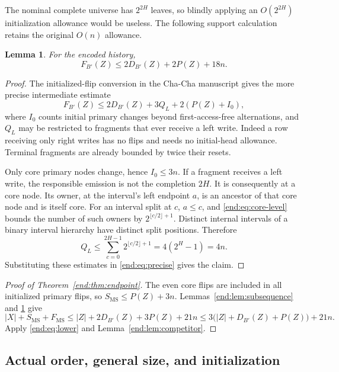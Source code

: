 \documentclass[11pt]{article}
\numberwithin{equation}{section}
\newtheorem{lemma}[theorem]{Lemma}
\newcommand{\MS}{\mathrm{MS}}
\begin{document}
The nominal complete universe has $2^{2H}$ leaves, so blindly applying
an $O(2^{2H})$ initialization allowance would be useless. The following
support calculation retains the original $O(n)$ allowance.

\begin{lemma}\label{end:lem:initial}
For the encoded history,
\[
 F_{B'}(Z)\le 2D_{B'}(Z)+2P(Z)+18n.
\]
\end{lemma}
\begin{proof}
The initialized-flip conversion in the Cha-Cha manuscript gives
the more precise intermediate estimate
\begin{equation}\label{end:eq:precise}
 F_{B'}(Z)\le 2D_{B'}(Z)+3Q_L+2(P(Z)+I_0),
\end{equation}
where $I_0$ counts initial primary changes beyond first-access-free
alternations, and $Q_L$ may be restricted to fragments that ever
receive a left write. Indeed a row receiving only right writes has no
flips and needs no initial-head allowance. Terminal fragments are
already bounded by twice their resets.

Only core primary nodes change, hence $I_0\le3n$. If a fragment
receives a left write, the responsible emission is not the completion
$2H$. It is consequently at a core node. Its owner, at the interval's
left endpoint $a$, is an ancestor of that core node and is itself core.
For an interval split at $c$, $a\le c$, and
\eqref{end:eq:core-level} bounds the number of such owners by
$2^{\lfloor c/2\rfloor+1}$. Distinct internal intervals of a binary
interval hierarchy have distinct split positions. Therefore
\[
 Q_L\le\sum_{c=0}^{2H-1}2^{\lfloor c/2\rfloor+1}
 =4(2^H-1)=4n.
\]
Substituting these estimates in \eqref{end:eq:precise} gives the claim.
\end{proof}

\begin{proof}[Proof of Theorem~\ref{end:thm:endpoint}]
The even core flips are included in all initialized primary flips, so
$S_{\MS}\le P(Z)+3n$. Lemmas~\ref{end:lem:subsequence} and
\ref{end:lem:initial} give
\[
 |X|+S_{\MS}+F_{\MS}
 \le |Z|+2D_{B'}(Z)+3P(Z)+21n
 \le3\bigl(|Z|+D_{B'}(Z)+P(Z)\bigr)+21n.
\]
Apply \eqref{end:eq:lower} and Lemma~\ref{end:lem:competitor}.
\end{proof}

\subsection{Actual order, general size, and initialization}
\end{document}

